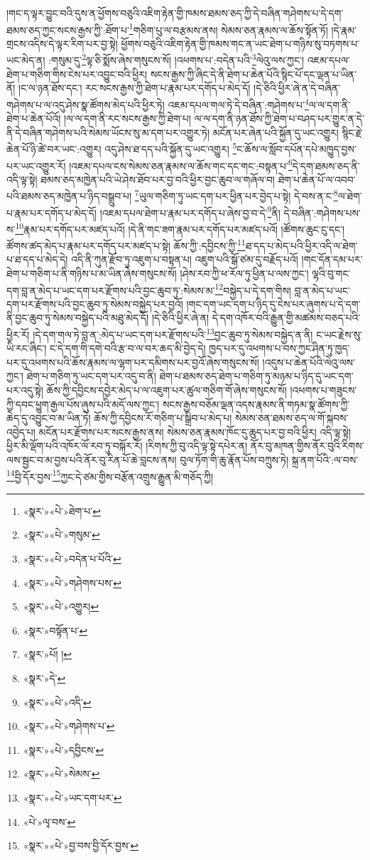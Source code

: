 །གང་ད་ལྟར་བྱུང་བའི་དུས་ན་ཕྱོགས་བཅུའི་འཇིག་རྟེན་གྱི་ཁམས་ཐམས་ཅད་ཀྱི་དེ་བཞིན་གཤེགས་པ་དེ་དག་ཐམས་ཅད་ཀྱང་སངས་རྒྱས་ཀྱི་:ཐོག་པ་\footnote{«སྣར་»«པེ་»ཐེག་པ་}གཅིག་པུ་ལ་བརྩམས་ནས། སེམས་ཅན་རྣམས་ལ་ཆོས་སྟོན་ཏོ། །དེ་རྣམ་གྲངས་འདིས་དེ་ལྟར་རིག་པར་བྱ་སྟེ། ཕྱོགས་བཅུའི་འཇིག་རྟེན་གྱི་ཁམས་གང་ན་ཡང་ཐེག་པ་གཉིས་སུ་བཏགས་པ་ཡང་མེད་ན། :གསུམ་དུ་\footnote{«སྣར་»«པེ་»གསུམ་}ལྟ་ཅི་སྨོས་ཞེས་གསུངས་སོ། །འཕགས་པ་:བདེན་པའི་\footnote{«སྣར་»«པེ་»བདེན་པ་པོའི་}ལེའུ་ལས་ཀྱང་། འཇམ་དཔལ་ཐེག་པ་གཅིག་གིས་ངེས་པར་འབྱུང་བའི་ཕྱིར། སངས་རྒྱས་ཀྱི་ཞིང་དེ་ནི་ཐེག་པ་ཆེན་པོའི་སྙིང་པོ་དང་ལྡན་པ་ཡིན་ནོ། །ང་ལ་ཉན་ཐོས་དང་། རང་སངས་རྒྱས་ཀྱི་ཐེག་པ་རྣམ་པར་དགོད་པ་མེད་དོ། །དེ་ཅིའི་ཕྱིར་ཞེ་ན་དེ་བཞིན་གཤེགས་པ་ལ་འདུ་ཤེས་སྣ་ཚོགས་མེད་པའི་ཕྱིར་ཏེ། འཇམ་དཔལ་གལ་ཏེ་དེ་བཞིན་:གཤེགས་པ་\footnote{«སྣར་»«པེ་»གཤེགས་པས་}ལ་ལ་དག་ནི་ཐེག་པ་ཆེན་པོའོ། །ལ་ལ་དག་ནི་རང་སངས་རྒྱས་ཀྱི་ཐེག་པ། ལ་ལ་དག་ནི་ཉན་ཐོས་ཀྱི་ཐེག་པ་བཤད་པར་གྱུར་ན་དེ་ནི་དེ་བཞིན་གཤེགས་པའི་སེམས་ཡོངས་སུ་མ་དག་པར་འགྱུར་ཏེ། མངོན་པར་ཞེན་པའི་སྐྱོན་དུ་ཡང་འགྱུར། སྙིང་རྗེ་ཆེན་པོ་ཉི་ཚེ་བར་ཡང་:འགྱུར། འདུ་ཤེས་ཐ་དད་པའི་སྐྱོན་དུ་ཡང་འགྱུར། \footnote{«སྣར་»«པེ་»འགྱུར།  }ང་ཆོས་ལ་སློབ་དཔོན་དཔེ་མཁྱུད་བྱས་པར་ཡང་འགྱུར་རོ། །འཇམ་དཔལ་ངས་སེམས་ཅན་རྣམས་ལ་ཆོས་གང་དང་གང་:བསྟན་པ་\footnote{«སྣར་»བསྟོན་པ་}དེ་དག་ཐམས་ཅད་ནི་འདི་ལྟ་སྟེ། ཐམས་ཅད་མཁྱེན་པའི་ཡེ་ཤེས་ཐོབ་པར་བྱ་བའི་ཕྱིར་བྱང་ཆུབ་ལ་གཞོལ་བ། ཐེག་པ་ཆེན་པོ་ལ་འབབ་པའི་ཐམས་ཅད་མཁྱེན་པ་ཉིད་བསྒྲུབ་པ། \footnote{«སྣར་»པོ། ། }ཡུལ་གཅིག་ཏུ་ཡང་དག་པར་ཕྱིན་པར་བྱེད་པ་སྟེ། དེ་བས་ན་ང་\footnote{«སྣར་»དེ་}ལ་ཐེག་པ་རྣམ་པར་དགོད་པ་མེད་དོ། །འཇམ་དཔལ་ཐེག་པ་རྣམ་པར་དགོད་པ་ཞེས་བྱ་བ་དེ་\footnote{«སྣར་»«པེ་»འདི་}ནི། དེ་བཞིན་:གཤེགས་པས་ས་\footnote{«སྣར་»«པེ་»གཤེགས་པ་}རྣམ་པར་དགོད་པར་མཛད་པའོ། །དེ་ནི་གང་ཟག་རྣམ་པར་དགོད་པར་མཛད་པའོ། །ཚོགས་ཆུང་ངུ་དང་། ཚོགས་ཚད་མེད་པ་རྣམ་པར་དགོད་པར་མཛད་པ་སྟེ། ཆོས་ཀྱི་:དབྱིངས་ཀྱི་\footnote{«སྣར་»«པེ་»དབྱིངས་}ཐ་དད་པ་མེད་པའི་ཕྱིར་འདི་ལ་ཐེག་པ་ཐ་དད་པ་མེད་དེ། འདི་ནི་ཀུན་རྫོབ་ཏུ་འཇུག་པ་བསྟན་པ། འཇུག་པའི་སྒོ་ཙམ་དུ་བརྗོད་པའོ། །གང་དོན་དམ་པར་ཐེག་པ་གཅིག་པ་ནི་གཉིས་པ་མ་ཡིན་ཞེས་གསུངས་སོ། །ཤེས་རབ་ཀྱི་ཕ་རོལ་ཏུ་ཕྱིན་པ་ལས་ཀྱང་། ལྷའི་བུ་གང་དག་བླ་ན་མེད་པ་ཡང་དག་པར་རྫོགས་པའི་བྱང་ཆུབ་ཏུ་:སེམས་མ་\footnote{«སྣར་»«པེ་»སེམས་}བསྐྱེད་པ་དེ་དག་གིས། བླ་ན་མེད་པ་ཡང་དག་པར་རྫོགས་པའི་བྱང་ཆུབ་ཏུ་སེམས་བསྐྱེད་པར་བྱའོ། །གང་དག་ཡང་དག་པ་ཉིད་དུ་ངེས་པར་ཞུགས་པ་དེ་དག་ནི་བྱང་ཆུབ་ཏུ་སེམས་བསྐྱེད་པའི་མཐུ་མེད་དོ། །དེ་ཅིའི་ཕྱིར་ཞེ་ན། དེ་དག་འཁོར་བའི་རྒྱུན་གྱི་མཚམས་བཅད་པའི་ཕྱིར་རོ། །དེ་དག་གལ་ཏེ་བླ་ན་:མེད་པ་ཡང་དག་པར་རྫོགས་པའི་\footnote{«སྣར་»«པེ་»ཡང་དག་པར་}བྱང་ཆུབ་ཏུ་སེམས་བསྐྱེད་ན་ནི། ང་ཡང་རྗེས་སུ་ཡི་རང་ཞིང་། ང་དེ་དག་གི་དགེ་བའི་རྩ་བ་ལ་བར་ཆད་མི་བྱེད་དེ། ཁྱད་པར་དུ་འཕགས་པ་བས་ཀྱང་ཤིན་ཏུ་ཁྱད་པར་དུ་འཕགས་པའི་ཆོས་རྣམས་ལ་ལྷག་པར་དམིགས་པར་བྱའོ་ཞེས་གསུངས་སོ། །འདུས་པ་ཆེན་པོའི་ལེའུ་ལས་ཀྱང་། ཐེག་པ་གཅིག་ཏུ་ཡང་དག་པར་འདུ་བ་ནི། ཐེག་པ་ཐམས་ཅད་ཐེག་པ་གཅིག་ཏུ་མཉམ་པ་ཉིད་དུ་ཡང་དག་པར་འདུ་སྟེ། ཆོས་ཀྱི་དབྱིངས་དབྱེར་མེད་པ་ལ་འཇུག་པར་ཚུལ་གཅིག་གོ་ཞེས་གསུངས་སོ། །འཕགས་པ་གཟུངས་ཀྱི་དབང་ཕྱུག་རྒྱལ་པོས་ཞུས་པའི་མདོ་ལས་ཀྱང་། སངས་རྒྱས་བཅོམ་ལྡན་འདས་རྣམས་ནི་གཏམ་སྣ་ཚོགས་ཀྱི་ཆེད་དུ་འབྱུང་བ་མ་ཡིན་ཏེ། ཆོས་ཀྱི་དབྱིངས་རོ་གཅིག་པ་སྒྲིབ་པ་མེད་པ། སེམས་ཅན་ཐམས་ཅད་ལ་གོ་སྐབས་འབྱེད་པ། མངོན་པར་རྫོགས་པར་སངས་རྒྱས་ནས། སེམས་ཅན་རྣམས་ཁོང་དུ་ཆུད་པར་བྱ་བའི་ཕྱིར། འདི་ལྟ་སྟེ། ཕྱིར་མི་ལྡོག་པའི་འཁོར་ལོ་རབ་ཏུ་བསྐོར་རོ། །རིགས་ཀྱི་བུ་འདི་ལྟ་སྟེ་དཔེར་ན། ནོར་བུ་མཁན་གྱིས་ནོར་བུའི་རིགས་ལས་སྦྱང་བ་མ་བྱས་པའི་ནོར་བུ་རིན་པོ་ཆེ་བླངས་ནས། བུལ་ཏོག་གི་ཆུ་རྣོན་པོས་བཀྲུས་ཏེ། སྐྲ་ནག་པོའི་:ལ་བས་\footnote{«པེ་»ལྭ་བས་}བྱི་དོར་བྱས་\footnote{«སྣར་»«པེ་»བྱ་བས་བྱི་དོར་བྱས་}ཀྱང་དེ་ཙམ་གྱིས་བརྩོན་འགྲུས་རྒྱུན་མི་གཅོད་ཀྱི། 